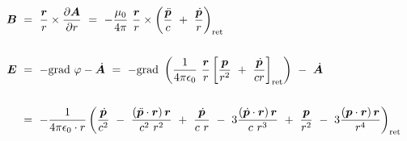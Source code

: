 \begin{align*}
\vec{B} \ &= \ \frac{\vec{r}}{r}\times\pdiff{\vec{A}}{r} \ = \ - \frac{\mu_0}{4\pi} \ \frac{\vec{r}}{r}\times \left(\frac{\ddot{\vec{p}}}{c}\ + \ \frac{\dot{\vec{p}}}{r}\right)_{\text{ret}}\\
\ \\
\vec{E} \ &= \ - \grad\varphi - \dot{\vec{A}} \ = \ -\grad\left(\frac{1}{4\pi\epsilon_0} \ \frac{\vec{r}}{r} \left[\frac{\vec{p}}{r^2} \ + \ \frac{\dot{\vec{p}}}{cr}\right]_{\text{ret}}\right) \ - \ \dot{\vec{A}}\\
\ \\
&= \ -\frac{1}{4\pi\epsilon_0 \cdot r} \left(\frac{\dot{\vec{p}}}{c^2} \ - \ \frac{\left(\ddot{\vec{p}}\cdot\vec{r}\right)\vec{r}}{c^2 \ r^2} \ + \ \frac{\dot{\vec{p}}}{c \ r} \ - \ 3 \frac{\left(\dot{\vec{p}}\cdot\vec{r}\right)\vec{r}}{c \ r^3} \ + \ \frac{\vec{p}}{r^2} \ - \ 3 \frac{\left(\vec{p}\cdot\vec{r}\right)\vec{r}}{r^4}\right)_{\text{ret}}
\end{align*}

